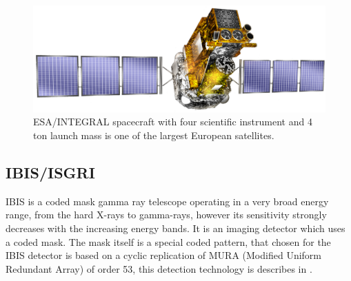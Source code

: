 \documentclass[oneside,a4paper,11pt]{report}
\begin{document}
\begin{figure}[!hbt]
\centering
\includegraphics[totalheight=4cm]{integral}
\caption{ESA/INTEGRAL spacecraft with four scientific instrument and 4 ton launch mass is one of the largest European satellites. }
\label{integral1} 
\end{figure}

\subsection{IBIS/ISGRI}
IBIS is a coded mask gamma ray telescope operating in a very broad energy range, from the hard X-rays to 
gamma-rays, however its sensitivity strongly decreases with the increasing energy bands. It is an 
imaging detector which uses a coded mask. The mask itself is a special coded pattern, that chosen for 
the IBIS detector is based on a cyclic replication of MURA (Modified Uniform Redundant Array) of order 
53, this detection technology is describes in \citet{mask1}.
\end{document}
